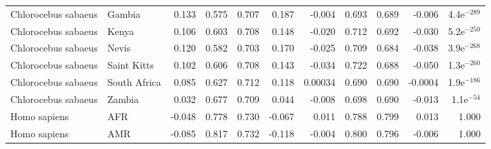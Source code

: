 \begin{center}
\begin{adjustbox}{width = 1\textwidth}
\begin{tabular}{llrrrrrrrrr}
 Chlorocebus sabaeus &                    Gambia &                              0.133 &                               0.575 &                 0.707 &                 0.187 &                             -0.004 &                               0.693 &                 0.689 &                -0.006 & 4.4e$^{-289}$ \\
 Chlorocebus sabaeus &                     Kenya &                              0.106 &                               0.603 &                 0.708 &                 0.148 &                             -0.020 &                               0.712 &                 0.692 &                -0.030 & 5.2e$^{-250}$ \\
 Chlorocebus sabaeus &                     Nevis &                              0.120 &                               0.582 &                 0.703 &                 0.170 &                             -0.025 &                               0.709 &                 0.684 &                -0.038 & 3.9e$^{-268}$ \\
 Chlorocebus sabaeus &               Saint Kitts &                              0.102 &                               0.606 &                 0.708 &                 0.143 &                             -0.034 &                               0.722 &                 0.688 &                -0.050 & 1.3e$^{-260}$ \\
 Chlorocebus sabaeus &              South Africa &                              0.085 &                               0.627 &                 0.712 &                 0.118 &                            0.00034 &                               0.690 &                 0.690 &               -0.0004 & 1.9e$^{-186}$ \\
 Chlorocebus sabaeus &                    Zambia &                              0.032 &                               0.677 &                 0.709 &                 0.044 &                             -0.008 &                               0.698 &                 0.690 &                -0.013 &  1.1e$^{-54}$ \\
        Homo sapiens &                       AFR &                             -0.048 &                               0.778 &                 0.730 &                -0.067 &                              0.011 &                               0.788 &                 0.799 &                 0.013 &         1.000 \\
        Homo sapiens &                       AMR &                             -0.085 &                               0.817 &                 0.732 &                -0.118 &                             -0.004 &                               0.800 &                 0.796 &                -0.006 &         1.000 \\

\end{tabular}
\end{adjustbox}
\end{center}
